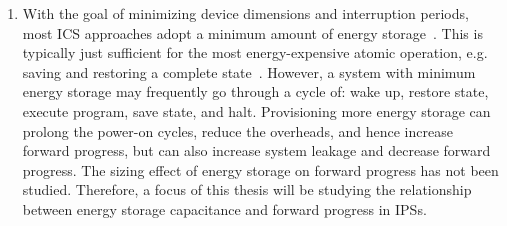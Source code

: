\begin{enumerate}

\item 
With the goal of minimizing device dimensions and interruption periods, most ICS approaches adopt a minimum amount of energy storage~\cite{balsamo2016hibernus++, 10.1145/2700249, 10.1145/2809695.2809707, 10.1145/3281300, 222579}. 
This is typically just sufficient for the most energy-expensive atomic operation, e.g. saving and restoring a complete state~\cite{balsamo2015hibernus}. 
However, a system with minimum energy storage may frequently go through a cycle of: wake up, restore state, execute program, save state, and halt. 
Provisioning more energy storage can prolong the power-on cycles, reduce the overheads, and hence increase forward progress, but can also increase system leakage and decrease forward progress. 
The sizing effect of energy storage on forward progress has not been studied. 
Therefore, a focus of this thesis will be studying the relationship between energy storage capacitance and forward progress in IPSs. 


\end{enumerate}
